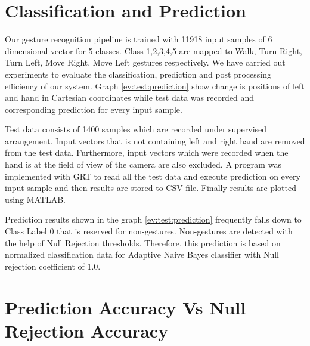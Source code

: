 

\section{Classification and Prediction}
Our gesture recognition pipeline is trained with 11918 input samples of 6 dimensional vector for 5 classes. Class 1,2,3,4,5 are mapped to Walk, Turn Right, Turn Left, Move Right, Move Left gestures respectively. We have carried out experiments to evaluate the classification, prediction and post processing efficiency of our system. Graph \ref{ev:test:prediction} show change is positions of left and hand in Cartesian coordinates while test data was recorded and corresponding prediction for every input sample.

Test data consists of 1400 samples which are recorded under supervised arrangement. Input vectors that is not containing left and right hand are removed from the test data. Furthermore, input vectors which were recorded when the hand is at the field of view of the camera are also excluded. A program was implemented with GRT to read all the test data and execute prediction on every input sample and then results are stored to CSV file. Finally results are plotted using MATLAB.

Prediction results shown in the graph \ref{ev:test:prediction} frequently falls down to Class Label 0 that is reserved for non-gestures. Non-gestures are detected with the help of Null Rejection thresholds. Therefore, this prediction is based on normalized classification data for Adaptive Naive Bayes classifier with Null rejection coefficient of 1.0.



\section{Prediction Accuracy Vs Null Rejection Accuracy}


